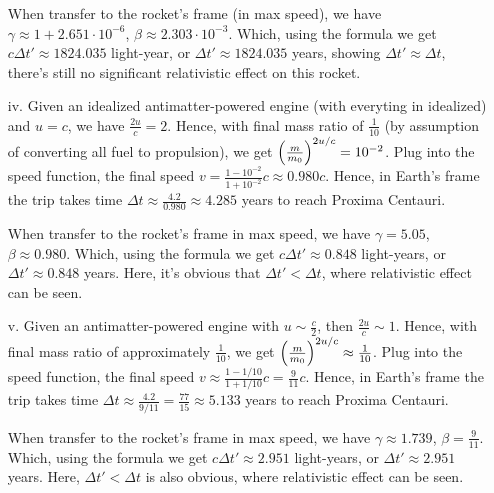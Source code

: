 \documentclass{article}
\DeclarePairedDelimiter{\paran}{(}{)}%
\begin{document}
\begin{itemize}
    When transfer to the rocket's frame (in max speed), we have $\gamma\approx 1+2.651\cdot 10^{-6}$, $\beta \approx 2.303\cdot 10^{-3}$. Which, using the formula we get $c\Delta t'\approx 1824.035$ light-year, or $\Delta t'\approx 1824.035$ years, showing $\Delta t'\approx \Delta t$, there's still no significant relativistic effect on this rocket.

    \hfil

    \item[iv.] Given an idealized antimatter-powered engine (with everyting in idealized) and $u=c$, we have $\frac{2u}{c}=2$. Hence, with final mass ratio of $\frac{1}{10}$ (by assumption of converting all fuel to propulsion), we get $\paran*{\frac{m}{m_0}}^{2u/c} = 10^{-2}$. Plug into the speed function, the final speed $v=\frac{1-10^{-2}}{1+10^{-2}}c \approx 0.980c$. Hence, in Earth's frame the trip takes time $\Delta t \approx \frac{4.2}{0.980} \approx 4.285$ years to reach Proxima Centauri.
    
    When transfer to the rocket's frame in max speed, we have $\gamma =5.05$, $\beta \approx 0.980$. Which, using the formula we get $c\Delta t' \approx 0.848$ light-years, or $\Delta t'\approx 0.848$ years. Here, it's obvious that $\Delta t'< \Delta t$, where relativistic effect can be seen.

    \hfil

    \item[v.] Given an antimatter-powered engine with $u\sim \frac{c}{2}$, then $\frac{2u}{c}\sim 1$. Hence, with final mass ratio of approximately $\frac{1}{10}$, we get $\paran*{\frac{m}{m_0}}^{2u/c}\approx \frac{1}{10}$. Plug into the speed function, the final speed $v\approx \frac{1-1/10}{1+1/10}c = \frac{9}{11}c$. Hence, in Earth's frame the trip takes time $\Delta t\approx \frac{4.2}{9/11} = \frac{77}{15} \approx 5.133$ years to reach Proxima Centauri.
    
    When transfer to the rocket's frame in max speed, we have $\gamma\approx 1.739$, $\beta=\frac{9}{11}$. Which, using the formula we get $c\Delta t'\approx 2.951$ light-years, or $\Delta t'\approx 2.951$ years. Here, $\Delta t'<\Delta t$ is also obvious, where relativistic effect can be seen.
\end{itemize}
\end{document}
